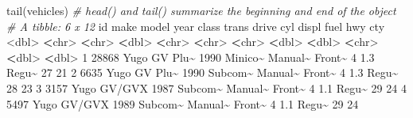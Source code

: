 \documentclass[
]{book}
\newenvironment{Shaded}{\begin{snugshade}}{\end{snugshade}}
\newcommand{\CommentTok}[1]{\textcolor[rgb]{0.56,0.35,0.01}{\textit{#1}}}
\newcommand{\DecValTok}[1]{\textcolor[rgb]{0.00,0.00,0.81}{#1}}
\newcommand{\ErrorTok}[1]{\textcolor[rgb]{0.64,0.00,0.00}{\textbf{#1}}}
\newcommand{\FloatTok}[1]{\textcolor[rgb]{0.00,0.00,0.81}{#1}}
\newcommand{\FunctionTok}[1]{\textcolor[rgb]{0.00,0.00,0.00}{#1}}
\newcommand{\NormalTok}[1]{#1}
\newcommand{\SpecialCharTok}[1]{\textcolor[rgb]{0.00,0.00,0.00}{#1}}
\begin{document}
\begin{Shaded}
\begin{Highlighting}[]
\FunctionTok{tail}\NormalTok{(vehicles) }\CommentTok{\# head() and tail() summarize the beginning and end of the object}
\CommentTok{\# A tibble: 6 x 12}
\NormalTok{     id make  model    year class   trans   drive    cyl displ fuel    hwy   cty}
  \SpecialCharTok{\textless{}}\NormalTok{dbl}\SpecialCharTok{\textgreater{}} \ErrorTok{\textless{}}\NormalTok{chr}\SpecialCharTok{\textgreater{}} \ErrorTok{\textless{}}\NormalTok{chr}\SpecialCharTok{\textgreater{}}   \ErrorTok{\textless{}}\NormalTok{dbl}\SpecialCharTok{\textgreater{}} \ErrorTok{\textless{}}\NormalTok{chr}\SpecialCharTok{\textgreater{}}   \ErrorTok{\textless{}}\NormalTok{chr}\SpecialCharTok{\textgreater{}}   \ErrorTok{\textless{}}\NormalTok{chr}\SpecialCharTok{\textgreater{}}  \ErrorTok{\textless{}}\NormalTok{dbl}\SpecialCharTok{\textgreater{}} \ErrorTok{\textless{}}\NormalTok{dbl}\SpecialCharTok{\textgreater{}} \ErrorTok{\textless{}}\NormalTok{chr}\SpecialCharTok{\textgreater{}} \ErrorTok{\textless{}}\NormalTok{dbl}\SpecialCharTok{\textgreater{}} \ErrorTok{\textless{}}\NormalTok{dbl}\SpecialCharTok{\textgreater{}}
\DecValTok{1} \DecValTok{28868}\NormalTok{ Yugo  GV Plu}\SpecialCharTok{\textasciitilde{}}  \DecValTok{1990}\NormalTok{ Minico}\SpecialCharTok{\textasciitilde{}}\NormalTok{ Manual}\SpecialCharTok{\textasciitilde{}}\NormalTok{ Front}\SpecialCharTok{\textasciitilde{}}     \DecValTok{4}   \FloatTok{1.3}\NormalTok{ Regu}\SpecialCharTok{\textasciitilde{}}    \DecValTok{27}    \DecValTok{21}
\DecValTok{2}  \DecValTok{6635}\NormalTok{ Yugo  GV Plu}\SpecialCharTok{\textasciitilde{}}  \DecValTok{1990}\NormalTok{ Subcom}\SpecialCharTok{\textasciitilde{}}\NormalTok{ Manual}\SpecialCharTok{\textasciitilde{}}\NormalTok{ Front}\SpecialCharTok{\textasciitilde{}}     \DecValTok{4}   \FloatTok{1.3}\NormalTok{ Regu}\SpecialCharTok{\textasciitilde{}}    \DecValTok{28}    \DecValTok{23}
\DecValTok{3}  \DecValTok{3157}\NormalTok{ Yugo  GV}\SpecialCharTok{/}\NormalTok{GVX   }\DecValTok{1987}\NormalTok{ Subcom}\SpecialCharTok{\textasciitilde{}}\NormalTok{ Manual}\SpecialCharTok{\textasciitilde{}}\NormalTok{ Front}\SpecialCharTok{\textasciitilde{}}     \DecValTok{4}   \FloatTok{1.1}\NormalTok{ Regu}\SpecialCharTok{\textasciitilde{}}    \DecValTok{29}    \DecValTok{24}
\DecValTok{4}  \DecValTok{5497}\NormalTok{ Yugo  GV}\SpecialCharTok{/}\NormalTok{GVX   }\DecValTok{1989}\NormalTok{ Subcom}\SpecialCharTok{\textasciitilde{}}\NormalTok{ Manual}\SpecialCharTok{\textasciitilde{}}\NormalTok{ Front}\SpecialCharTok{\textasciitilde{}}     \DecValTok{4}   \FloatTok{1.1}\NormalTok{ Regu}\SpecialCharTok{\textasciitilde{}}    \DecValTok{29}    \DecValTok{24}

\end{Highlighting}
\end{Shaded}
\end{document}
